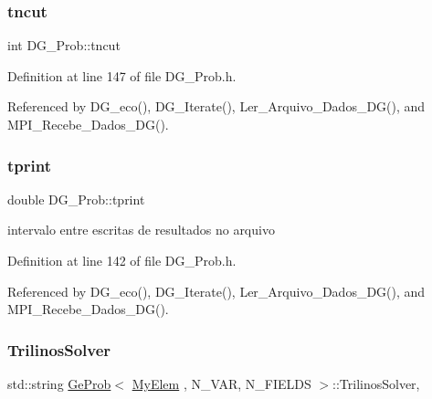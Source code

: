 \subsubsection{\texorpdfstring{tncut}{tncut}}
{\footnotesize\ttfamily int D\+G\+\_\+\+Prob\+::tncut\hspace{0.3cm}{\ttfamily [private]}}



Definition at line 147 of file D\+G\+\_\+\+Prob.\+h.



Referenced by D\+G\+\_\+eco(), D\+G\+\_\+\+Iterate(), Ler\+\_\+\+Arquivo\+\_\+\+Dados\+\_\+\+D\+G(), and M\+P\+I\+\_\+\+Recebe\+\_\+\+Dados\+\_\+\+D\+G().

\mbox{\label{classDG__Prob_a29260e59aa92d97bd90a9fee709c3115}} 
\subsubsection{\texorpdfstring{tprint}{tprint}}
{\footnotesize\ttfamily double D\+G\+\_\+\+Prob\+::tprint\hspace{0.3cm}{\ttfamily [private]}}



intervalo entre escritas de resultados no arquivo 



Definition at line 142 of file D\+G\+\_\+\+Prob.\+h.



Referenced by D\+G\+\_\+eco(), D\+G\+\_\+\+Iterate(), Ler\+\_\+\+Arquivo\+\_\+\+Dados\+\_\+\+D\+G(), and M\+P\+I\+\_\+\+Recebe\+\_\+\+Dados\+\_\+\+D\+G().

\mbox{\label{classGeProb_aac89bac6728a7f42998e0edb80dc835d}} 
\subsubsection{\texorpdfstring{Trilinos\+Solver}{TrilinosSolver}}
{\footnotesize\ttfamily std\+::string \hyperlink{classGeProb}{Ge\+Prob}$<$ \hyperlink{DG__Prob_8h_a83cd887ced9a6587428f267e50cd4787}{My\+Elem} , N\+\_\+\+V\+AR, N\+\_\+\+F\+I\+E\+L\+DS $>$\+::Trilinos\+Solver\hspace{0.3cm}{\ttfamily [protected]}, {\ttfamily [inherited]}}



